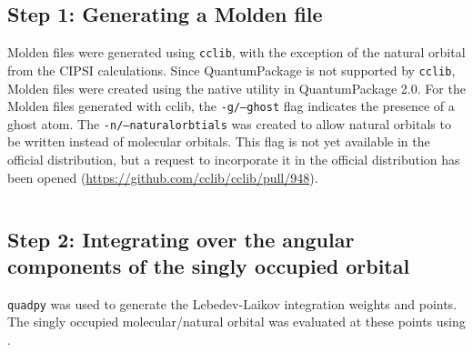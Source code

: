 \subsection{Step 1: Generating a Molden file}
Molden files were generated using \texttt{cclib}, with the exception of the natural orbital from the CIPSI calculations. 
Since QuantumPackage is not supported by \texttt{cclib}, Molden files were created using the native utility in QuantumPackage 2.0. 
For the Molden files generated with cclib, the \texttt{-g/--ghost} flag indicates the presence of a ghost atom.
The \texttt{-n/--naturalorbtials} was created to allow natural orbitals to be written instead of molecular orbitals.
This flag is not yet available in the official distribution, but a request to incorporate it in the official distribution has been opened (\url{https://github.com/cclib/cclib/pull/948}).

%
\inputminted{zsh}{parts/cclibmolden.sh}

\subsection{Step 2: Integrating over the angular components of the singly occupied orbital}

\texttt{quadpy} was used to generate the Lebedev-Laikov integration weights and points.
The singly occupied molecular/natural orbital was evaluated at these points using .

%
\inputminted{python}{parts/anionradialint.py}

